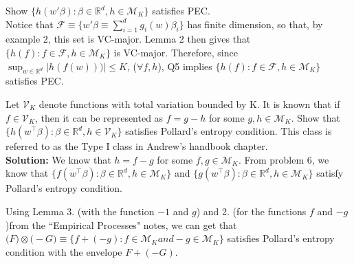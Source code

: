 \documentclass[11pt,letterpaper]{article}                  %
\begin{document}
\bigskip
\begin{problem}
Show $\{h(w'\beta): \beta\in \mathbb{R}^d, h \in \mathcal{M}_K\}$
satisfies PEC. \\

Notice that $\mathcal{F}\equiv\{ w'\beta \equiv \sum_{i=1}^dg_i(w)\beta_i\}$ has finite
dimension, so that, by example 2, this set is VC-major. Lemma 2 then
gives that $\{h(f):f\in \mathcal{F},h\in \mathcal{M}_K\}$ is
VC-major. Therefore, since $\sup_{w\in \mathbb{R}^d}|h(f(w)))| \le K$,
($\forall f,h$), Q5 implies $\{h(f):f\in \mathcal{F},h\in \mathcal{M}_K\}$ satisfies PEC.

\end{problem}

\bigskip
\begin{problem} Let $\mathcal{V}_K$ denote functions with total variation bounded by K. It is known that if $f \in \mathcal{V}_K$, then it can be represented as $f = g - h$ for some $g, h \in \mathcal{M}_K.$ Show that $\{h(w^\intercal \beta): \beta \in \mathbb{R}^d, h \in \mathcal{V}_K \}$ satisfies Pollard's entropy condition. This class is referred to as the Type I class in Andrew's handbook chapter. \\
	
	\textbf{Solution:} We know that $h = f - g$ for some $f, g \in \mathcal{M}_K$. From problem 6, we know that $\{f(w^\intercal \beta): \beta \in \mathbb{R}^d, h \in \mathcal{M}_K \}$ and $\{g(w^\intercal \beta): \beta \in \mathbb{R}^d, h \in \mathcal{M}_K \}$ satisfy Pollard's entropy condition.  
	
	Using Lemma 3. (with the function $-1$ and $g$) and 2. (for the functions $f$ and $-g$)from the ``Empirical Processes" notes, we can get that $\mathfrak(F) \otimes \mathfrak(-G) \equiv \{f + (-g): f \in \mathcal{M}_K and -g \in \mathcal{M}_K \}$ satisfies Pollard's entropy condition with the envelope $F + (-G)$.   

\end{problem}
\end{document}
